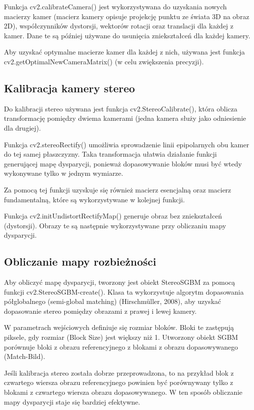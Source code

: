 \documentclass[magisterska]{pracadypl}
\begin{document}
Funkcja cv2.calibrateCamera() jest wykorzystywana do uzyskania nowych macierzy kamer (macierz kamery opisuje projekcję punktu ze świata 3D na obraz 2D), współczynników dystorsji, wektorów rotacji oraz translacji dla każdej z kamer. Dane te są później używane do usunięcia zniekształceń dla każdej kamery.

Aby uzyskać optymalne macierze kamer dla każdej z nich, używana jest funkcja cv2.getOptimalNewCameraMatrix() (w celu zwiększenia precyzji).

\subsection{Kalibracja kamery stereo}

Do kalibracji stereo używana jest funkcja cv2.StereoCalibrate(), która oblicza transformację pomiędzy dwiema kamerami (jedna kamera służy jako odniesienie dla drugiej).

Funkcja cv2.stereoRectify() umożliwia sprowadzenie linii epipolarnych obu kamer do tej samej płaszczyzny. Taka transformacja ułatwia działanie funkcji generującej mapę dysparycji, ponieważ dopasowywanie bloków musi być wtedy wykonywane tylko w jednym wymiarze.

Za pomocą tej funkcji uzyskuje się również macierz esencjalną oraz macierz fundamentalną, które są wykorzystywane w kolejnej funkcji.

Funkcja cv2.initUndistortRectifyMap() generuje obraz bez zniekształceń (dystorsji). Obrazy te są następnie wykorzystywane przy obliczaniu mapy dysparycji.

\subsection{Obliczanie mapy rozbieżności}

Aby obliczyć mapę dysparycji, tworzony jest obiekt StereoSGBM za pomocą funkcji cv2.StereoSGBM-create(). Klasa ta wykorzystuje algorytm dopasowania półglobalnego (semi-global matching) (Hirschmüller, 2008), aby uzyskać dopasowanie stereo pomiędzy obrazami z prawej i lewej kamery.

W parametrach wejściowych definiuje się rozmiar bloków. Bloki te zastępują piksele, gdy rozmiar (Block Size) jest większy niż 1. Utworzony obiekt SGBM porównuje bloki z obrazu referencyjnego z blokami z obrazu dopasowywanego (Match-Bild).

Jeśli kalibracja stereo została dobrze przeprowadzona, to na przykład blok z czwartego wiersza obrazu referencyjnego powinien być porównywany tylko z blokami z czwartego wiersza obrazu dopasowywanego. W ten sposób obliczanie mapy dysparycji staje się bardziej efektywne.
\end{document}
